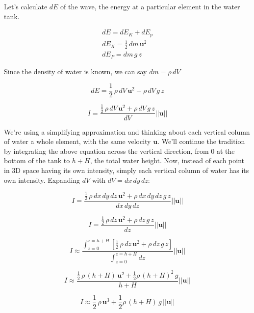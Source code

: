 \documentclass{article}
\begin{document}
Let's calculate $dE$ of the wave, the energy at a particular element in the water tank.

\begin{eqnarray}
    dE = dE_K + dE_p
    \\
    dE_K = \frac{1}{2}\,dm\,\mathbf{u}^2
    \\
    dE_P = dm\,g\,z
\end{eqnarray}

Since the density of water is known, we can say $dm = \rho\,dV$

\begin{equation}
    dE = \frac{1}{2}\,\rho\,dV\,\mathbf{u}^2 + \rho\,dV\,g\,z
\end{equation}

\begin{equation}
    I = \frac{\frac{1}{2}\,\rho\,dV\,\mathbf{u}^2 + \rho\,dV\,g\,z}{dV} ||\mathbf{u}||
\end{equation}

We're using a simplifying approximation and thinking about each vertical column of water a whole element, with the same velocity $\mathbf{u}$. We'll continue the tradition by integrating the above equation across the vertical direction, from 0 at the bottom of the tank to $h+H$, the total water height. Now, instead of each point in 3D space having its own intensity, simply each vertical column of water has its own intensity. Expanding $dV$ with $dV = dx\,dy\,dz$:

\begin{equation}
    I = \frac{\frac{1}{2}\,\rho\,dx\,dy\,dz\,\mathbf{u}^2 + \rho\,dx\,dy\,dz\,g\,z}{dx\,dy\,dz} ||\mathbf{u}||
\end{equation}

\begin{equation}
    I = \frac{\frac{1}{2}\,\rho\,dz\,\mathbf{u}^2 + \rho\,dz\,g\,z}{dz} ||\mathbf{u}||
\end{equation}

\begin{equation}
    I \approx \frac{\int_{z=0}^{z=h+H} \left[ \frac{1}{2}\,\rho\,dz\,\mathbf{u}^2 + \rho\,dz\,g\,z \right] }{\int_{z=0}^{z=h+H} dz} ||\mathbf{u}||
\end{equation}

\begin{equation}
    I \approx \frac{\frac{1}{2}\,\rho\,(h+H)\,\mathbf{u}^2 + \frac{1}{2}\rho\,(h+H)^2\,g }{h+H} ||\mathbf{u}||
\end{equation}

\begin{equation}
    I \approx \frac{1}{2}\,\rho\,\mathbf{u}^3 + \frac{1}{2}\rho\,(h+H)\,g\,||\mathbf{u}||
\end{equation}
\end{document}
